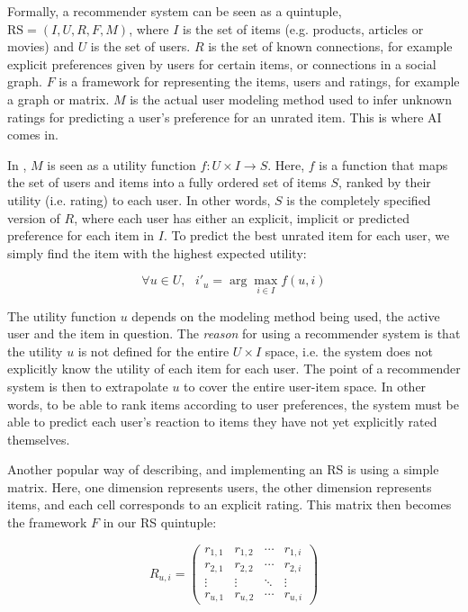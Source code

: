 Formally, a recommender system can be seen as a quintuple, $\mathrm{RS} = (I, U, R, F, M)$,
where $I$ is the set of items (e.g. products, articles or movies) and $U$ is the set of users.
$R$ is the set of known connections, for example explicit preferences given by users for certain items, or connections in a social graph.
$F$ is a framework for representing the items, users and ratings, for example a graph or matrix. 
$M$ is the actual user modeling method used to infer unknown ratings 
for predicting a user's preference for an unrated item. This is where AI comes in.

In \cite{Adomavicius2005}, $M$ is seen as a utility function
$f: U \times I \rightarrow S$. Here, $f$ is a function that maps the set
of users and items into a fully ordered set of items $S$, ranked by their
utility (i.e. rating) to each user. In other words, $S$ is the completely specified version of $R$,
where each user has either an explicit, implicit or predicted preference for each item in $I$.
To predict the best unrated item for each user, we simply find the item with the highest expected utility:

\begin{equation*}
  \forall u \in U,\text{ } i'_u = \arg\max_{i \in I} f(u,i)
\end{equation*}

The utility function $u$ depends on the modeling method being used, the active user and the item in question. 
The \emph{reason} for using a recommender system is that the utility $u$ is not defined for the entire $U \times I$ space, 
i.e. the system does not explicitly know the utility of each item for each user. 
The point of a recommender system is then to extrapolate $u$ to cover the entire user-item space. 
In other words, to be able to rank items according to user preferences, 
the system must be able to predict each user's reaction to items they have not yet explicitly rated themselves. 

Another popular way of describing, and implementing an RS is using a simple matrix. 
Here, one dimension represents users, the other dimension represents items,
and each cell corresponds to an explicit rating. This matrix then becomes the framework $F$ in our 
RS quintuple:

\begin{equation*}
 R_{u,i} =
 \begin{pmatrix}
  r_{1,1} & r_{1,2} & \cdots & r_{1,i} \\
  r_{2,1} & r_{2,2} & \cdots & r_{2,i} \\
  \vdots  & \vdots  & \ddots & \vdots  \\
  r_{u,1} & r_{u,2} & \cdots & r_{u,i}
 \end{pmatrix}
\end{equation*}

